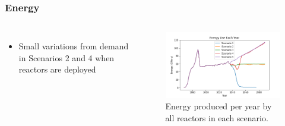 \begin{frame}
    \frametitle{Energy}
    \begin{columns}
        \column[t]{5cm}
        \begin{itemize}
            \item Small variations from demand in Scenarios 2 and 4 when 
                  reactors are deployed
        \end{itemize}

        \column[t]{5cm}
        \begin{figure}
            \centering 
            \includegraphics[scale=0.3]{figures/energy_scenarios_all.png}
            \caption{Energy produced per year by all reactors in each scenario.}
            \label{fig:energy}
        \end{figure}
    \end{columns}
\end{frame}

